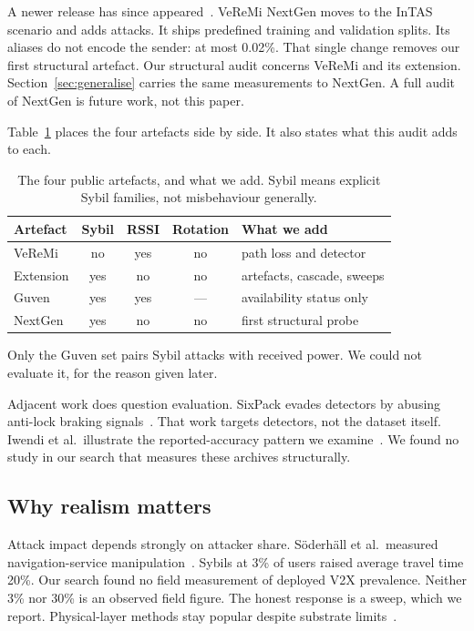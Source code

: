 \documentclass[journal,twoside]{IEEEtran}
\begin{document}
A newer release has since appeared~\cite{nextgen2026}.
VeReMi NextGen moves to the InTAS scenario and adds attacks.
It ships predefined training and validation splits.
Its aliases do not encode the sender: at most 0.02\%.
That single change removes our first structural artefact.
Our structural audit concerns VeReMi and its extension.
Section~\ref{sec:generalise} carries the same measurements to NextGen.
A full audit of NextGen is future work, not this paper.

Table~\ref{tab:datasets} places the four artefacts side by side.
It also states what this audit adds to each.

\begin{table}[t]
\caption{The four public artefacts, and what we add.
Sybil means explicit Sybil families, not misbehaviour generally.}
\label{tab:datasets}
\centering
\scriptsize
\begin{tabular}{@{}>{\raggedright\arraybackslash}p{1.7cm}ccc>{\raggedright\arraybackslash}p{2.0cm}@{}}
\toprule
Artefact & Sybil & RSSI & Rotation & What we add \\
\midrule
VeReMi \cite{heijden2018} & no & yes & no & path loss and detector \\
Extension \cite{kamel2020} & yes & no & no & artefacts, cascade, sweeps \\
Guven \cite{guven2024} & yes & yes & --- & availability status only \\
NextGen \cite{nextgen2026} & yes & no & no & first structural probe \\
\bottomrule
\end{tabular}
\end{table}

Only the Guven set pairs Sybil attacks with received power.
We could not evaluate it, for the reason given later.

Adjacent work does question evaluation.
SixPack evades detectors by abusing anti-lock braking signals~\cite{sixpack2021}.
That work targets detectors, not the dataset itself.
Iwendi et al.\ illustrate the reported-accuracy pattern we examine~\cite{iwendi2018}.
We found no study in our search that measures these archives structurally.

\subsection{Why realism matters}

Attack impact depends strongly on attacker share.
S\"oderh\"all et al.\ measured navigation-service manipulation~\cite{soderhall2025}.
Sybils at 3\% of users raised average travel time 20\%.
Our search found no field measurement of deployed V2X prevalence.
Neither 3\% nor 30\% is an observed field figure.
The honest response is a sweep, which we report.
Physical-layer methods stay popular despite substrate limits~\cite{taysi2025,almesaeed2025}.
\end{document}
